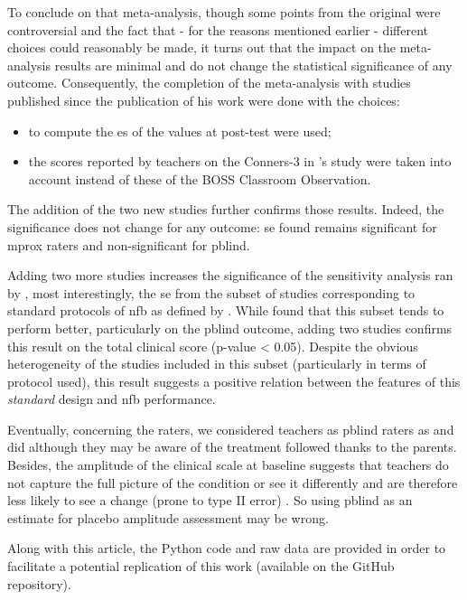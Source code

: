 To conclude on that meta-analysis, though some points from the original were controversial and the fact that 
- for the reasons mentioned earlier - different choices could reasonably be made, 
it turns out that the impact on the meta-analysis results are minimal and do not change the statistical significance of any outcome. 
Consequently, the completion of the meta-analysis with studies published since the publication of his work were done with the choices: 
\begin{itemize} 
	\item to compute the \gls{es} of \citet{Arnold2014} the values at post-test were used;
	\item the scores reported by teachers on the Conners-3 in \citeauthor{Steiner2014}'s study were taken into account instead of these of 
	the BOSS Classroom Observation.
\end{itemize} 

The addition of the two new studies \citep{Strehl2017, Baumeister2016} further confirms those results. Indeed, 
the significance does not change for any outcome: \gls{se} found remains significant for \gls{mprox} raters and 
non-significant for \gls{pblind}. 

Adding two more studies increases the significance of the sensitivity analysis ran by \citeauthor{Cortese2016}, 
most interestingly, the \gls{se} from the subset of studies corresponding to standard protocols of \gls{nfb} as 
defined by \citet{Arns2014}. While \citeauthor{Cortese2016} found that this subset tends to perform better, particularly
on the \gls{pblind} outcome, adding two studies confirms this result on the total clinical score (p-value < 0.05). 
Despite the obvious heterogeneity of the studies included in this subset (particularly in terms of protocol used), 
this result suggests a positive relation between the features of this \emph{standard} design and \gls{nfb} performance.

Eventually, concerning the raters, we considered teachers as \gls{pblind} raters as \citeauthor{Cortese2016} and 
\citeauthor{Micoulaud2014} did although they may be aware of the treatment followed thanks to the parents. 
Besides, the amplitude of the clinical scale at baseline suggests that teachers do not capture the full picture of 
the condition or see it differently and are therefore less likely to see a change (prone to type II error) \citep{Sollie2013, Narad2015}.
So using \gls{pblind} as an estimate for placebo amplitude assessment may be wrong.

Along with this article, the Python code and raw data are provided in order to facilitate a potential replication of this work
(available on the GitHub repository).  

